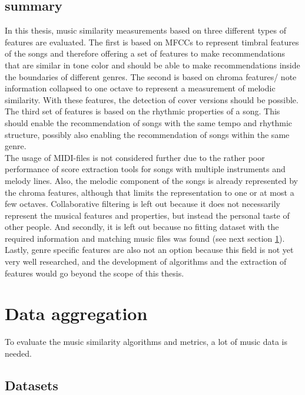 \subsection{summary}

In this thesis, music similarity measurements based on three different types of features are evaluated. 
The first is based on MFCCs to represent timbral features of the songs and therefore offering a set of features to make recommendations that are similar in tone color and should be able to make recommendations inside the boundaries of different genres.
The second is based on chroma features/ note information collapsed to one octave to represent a measurement of melodic similarity. With these features, the detection of cover versions should be possible.  
The third set of features is based on the rhythmic properties of a song. This should enable the recommendation of songs with the same tempo and rhythmic structure, possibly also enabling the recommendation of songs within the same genre.
\ \\
The usage of MIDI-files is not considered further due to the rather poor performance of score extraction tools for songs with multiple instruments and melody lines. Also, the melodic component of the songs is already represented by the chroma features, although that limits the representation to one or at most a few octaves. 
Collaborative filtering is left out because it does not necessarily represent the musical features and properties, but instead the personal taste of other people. And secondly, it is left out because no fitting dataset with the required information and matching music files was found (see next section \ref{data}). 
Lastly, genre specific features are also not an option because this field is not yet very well researched, and the development of algorithms and the extraction of features would go beyond the scope of this thesis.

\section{Data aggregation}\label{data}

To evaluate the music similarity algorithms and metrics, a lot of music data is needed.

\subsection{Datasets}\label{datasets}


